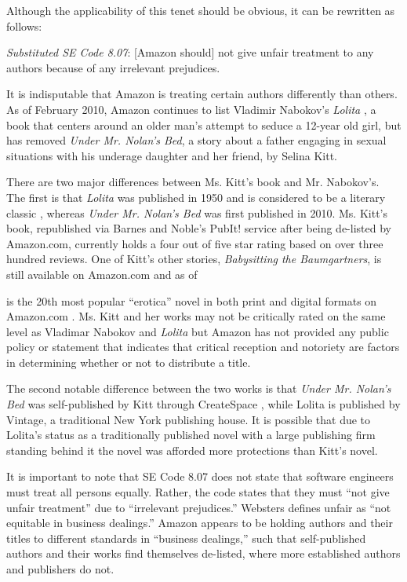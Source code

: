 \documentclass[11pt]{article}
\begin{document}
\begin{multicols}{2}
Although the applicability of this tenet should be obvious, it can be rewritten as follows:

\emph{Substituted SE Code 8.07}: [Amazon should] not give unfair treatment to any authors because of any irrelevant prejudices.

It is indisputable that Amazon is treating certain authors differently than others.  As of February 2010, Amazon continues to list Vladimir Nabokov's \emph{Lolita} \cite{AmazonLolitaDTPListing}, a book that centers around an older man's attempt to seduce a 12-year old girl, but has removed \emph{Under Mr. Nolan's Bed}, a story about a father engaging in sexual situations with his underage daughter and her friend, by Selina Kitt. \cite{KittSelfPubRevolution}  

There are two major differences between Ms. Kitt's book and Mr. Nabokov's.  The first is that \emph{Lolita} was published in 1950 \cite{WikipediaLolita} and is considered to be a literary classic \cite{MLTop100}, whereas \emph{Under Mr. Nolan's Bed} was first published in 2010.  Ms. Kitt's book, republished via Barnes and Noble's PubIt! service after being de-listed by Amazon.com, currently holds a four out of five star rating based on over three hundred reviews. \cite{UnderMrNolan} One of Kitt's other stories, \emph{Babysitting the Baumgartners}, is still available on Amazon.com and as of \date{February 24, 2011} is the 20th most popular ``erotica'' novel in both print and digital formats on Amazon.com \cite{AmazonBabysittingListing}.  Ms. Kitt and her works may not be critically rated on the same level as Vladimar Nabokov and \emph{Lolita} but Amazon has not provided any public policy or statement that indicates that critical reception and notoriety are factors in determining whether or not to distribute a title.

The second notable difference between the two works is that \emph{Under Mr. Nolan's Bed} was self-published by Kitt through CreateSpace \cite{KittSelfPubRevolution}, while Lolita is published by Vintage, a traditional New York publishing house.  \cite{WorldCatLolita} It is possible that due to Lolita's status as a traditionally published novel with a large publishing firm standing behind it the novel was afforded more protections than Kitt's novel.  

It is important to note that SE Code 8.07 does not state that software engineers must treat all persons equally.  Rather, the code states that they must ``not give unfair treatment'' due to ``irrelevant prejudices.'' Websters defines unfair as ``not equitable in business dealings.'' \cite{WebsterOnlineDict}  Amazon appears to be holding authors and their titles to different standards in ``business dealings,'' such that self-published authors and their works find themselves de-listed, where more established authors and publishers do not.  


\end{multicols}
\end{document}
